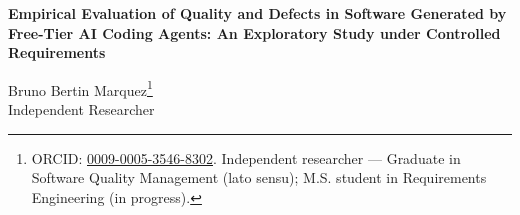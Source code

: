 \documentclass[11pt]{article}
\begin{document}
\begin{titlepage}
  \begin{center}
    {\LARGE\bfseries Empirical Evaluation of Quality and Defects in Software Generated by Free-Tier AI Coding Agents: An Exploratory Study under Controlled Requirements\par}
    \vspace{1.2em}
    {\large Bruno Bertin Marquez\thanks{ORCID: \href{https://orcid.org/0009-0005-3546-8302}{0009-0005-3546-8302}. Independent researcher --- Graduate in Software Quality Management (lato sensu); M.S. student in Requirements Engineering (in progress).}\\[0.3em]
    Independent Researcher\par}
  \end{center}
\end{titlepage}
\end{document}
